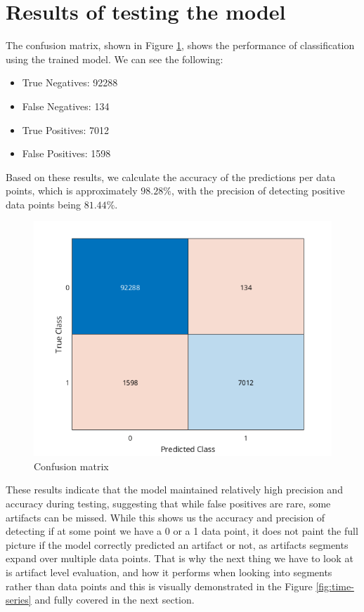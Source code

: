 \documentclass[12pt,a4paper,titlepage,openany]{report}
\begin{document}
\section{Results of testing the model}

The confusion matrix, shown in Figure \ref{fig:confusion-matrix}, shows the performance of classification using the trained model. We can see the following:
\begin{itemize}
    \item True Negatives: 92288
    \item False Negatives: 134
    \item True Positives: 7012
    \item False Positives: 1598
\end{itemize}

Based on these results, we calculate the accuracy of the predictions per data points, which is approximately \(98.28\%\), with the precision of detecting positive data points being \(81.44\%\). 

\begin{figure}[H]
    \includegraphics[width=1\linewidth]{./new_training/training_test_data_confusion_chart_new.png}
    \caption{Confusion matrix}
    \label{fig:confusion-matrix}
\end{figure}

These results indicate that the model maintained relatively high precision and accuracy during testing, suggesting that while false positives are rare, some artifacts can be missed. While this shows us the accuracy and precision of detecting if at some point we have a 0 or a 1 data point, it does not paint the full picture if the model correctly predicted an artifact or not, as artifacts segments expand over multiple data points. That is why the next thing we have to look at is artifact level evaluation, and how it performs when looking into segments rather than data points and this is visually demonstrated in the Figure \ref{fig:time-series} and fully covered in the next section.
\end{document}
